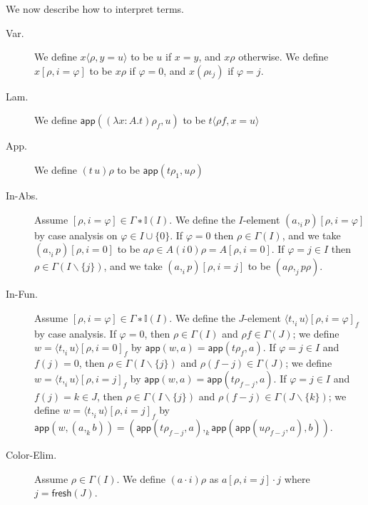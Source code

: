 \documentclass[english]{PaperTools/latex/entcs}
\theoremstyle{plain}
\theoremstyle{definition}
\theoremstyle{remark}
\newcommand\param[1]{\!\cdot\!#1}
\newcommand\fp[3]{⟨#2 ,_{#1} #3⟩}
\def\fresh#1{\mathsf{fresh}(#1)}
\def\app#1#2{\mathsf{app}(#1,#2)}
\begin{document}
\bigskip
We now describe how to interpret terms.
\begin{description}
  \item[\sc Var.]
    We define $x⟨ρ,y=u⟩$ to be $u$ if $x = y$, and $xρ$ otherwise.
    We define $x[ρ,i=φ]$ to be $xρ$ if $φ = 0$, and
    $x(ρι_j)$ if $φ = j$.

  \item[\sc Lam.]
    We define $\app{(λ x:A.t)ρ_f}{u}$ to be $t⟨ρf,x=u⟩$

  \item[\sc App.]
    We define $(t\,u)ρ$ to be $\app{tρ_1}{uρ}$

  \item[\sc In-Abs.]
    Assume $[ρ,i=φ] ∈ Γ∗𝕀(I)$.  We define the $I$-element $(a ,_i p)[ρ,i=φ]$
    by case analysis on $φ ∈ I ∪ \{0\}$.
    If $φ = 0$ then $ρ ∈ Γ(I)$, and we take $(a ,_i p)[ρ,i=0]$ to be
    $aρ ∈ A(i\,0)ρ = A[ρ,i=0]$.
    If $φ = j ∈ I$ then $ρ ∈ Γ(I\backslash\{j\})$, and we take
    $(a ,_i p)[ρ,i=j]$ to be $(aρ ,_j pρ)$.

  \item[\sc In-Fun.]
    Assume $[ρ,i=φ] ∈ Γ∗𝕀(I)$.  We define the $J$-element ${\fp i t u}[ρ,i=φ]_f$
    by case analysis.
    If $φ = 0$, then $ρ ∈ Γ(I)$ and $ρf ∈ Γ(J)$; we define
    $w = {\fp i t u}[ρ,i=0]_f$ by $\app{w}{a} = \app{tρ_f}{a}$.
    If $φ = j ∈ I$ and $f(j) = 0$, then $ρ ∈ Γ(I\backslash\{j\})$ and $ρ(f-j) ∈ Γ(J)$;
    we define $w = {\fp i t u}[ρ,i=j]_f$ by $\app{w}{a} = \app{tρ_{f-j}}{a}$.
    If $φ = j ∈ I$ and $f(j) = k ∈ J$, then $ρ ∈ Γ(I\backslash\{j\})$ and $ρ(f-j) ∈ Γ(J\backslash\{k\})$;
    we define $w = {\fp i t u}[ρ,i=j]_f$ by
    $\app{w}{(a ,_k b)} = ( \app{tρ_{f-j}}{a} ,_k {\app{\app{uρ_{f-j}}{a}}{b}} )$.

  \item[\sc Color-Elim.]
    Assume $ρ ∈ Γ(I)$.  We define $(a \param i)ρ$ as
    $a[ρ,i=j]·j$ where $j = \fresh{J}$.
\end{description}
\end{document}
